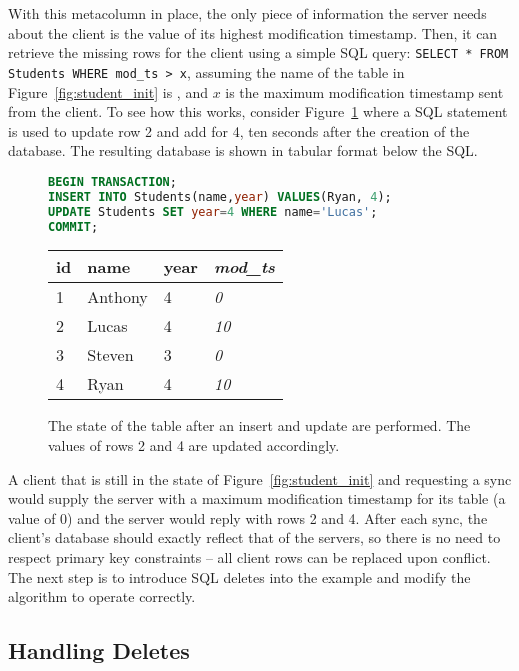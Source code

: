 With this metacolumn in place, the only piece of information the server needs about the
client is the value of its highest modification timestamp. Then, it can retrieve
the missing rows for the client using a simple SQL query: \texttt{SELECT * FROM
Students WHERE mod\_ts > x}, assuming the name of the table in
Figure~\ref{fig:student_init} is , and $x$ is the maximum
modification timestamp sent from the client. To see how this works, consider
Figure~\ref{fig:student_update} where a SQL statement is used to update row 2
and add for 4, ten seconds after the creation of the database. The resulting
database is shown in tabular format below the SQL.

\begin{figure}[h!]
\begin{lstlisting}[language=sql]
BEGIN TRANSACTION;
INSERT INTO Students(name,year) VALUES(Ryan, 4);
UPDATE Students SET year=4 WHERE name='Lucas';
COMMIT;
\end{lstlisting}
\center
\begin{tabular}{ l  l  l  l }
id  & name      & year  & \textit{mod\_ts} \\
\hline
1   & Anthony   & 4     & \textit{0}        \\
2   & Lucas     & 4     & \textit{10}        \\
3   & Steven    & 3     & \textit{0}        \\
4   & Ryan      & 4     & \textit{10}        \\
\end{tabular}
\caption{The state of the  table after an insert and update are
performed. The \modts values of rows 2 and 4 are updated accordingly.}
\label{fig:student_update}
\end{figure}

A client that is still in the state of Figure~\ref{fig:student_init} and
requesting a sync would supply the server with a maximum modification
timestamp for its  table (a value of 0) and the server would reply with
rows 2 and 4. After each sync, the client's database should exactly reflect that
of the servers, so there is no need to respect primary key constraints -- all
client rows can be replaced upon conflict. The next step is to introduce SQL
deletes into the example and modify the algorithm to operate correctly.



\subsection{Handling Deletes}  \label{sec:}


